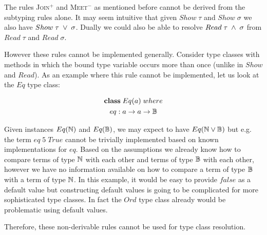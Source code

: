 The rules \textsc{Join}$^+$ and \textsc{Meet}$^-$ as mentioned before cannot be derived from the subtyping rules alone.
It may seem intuitive that given $Show \; \tau$ and $Show \; \sigma$ we also have $Show \; \tau \; \vee \; \sigma$.
Dually we could also be able to resolve $Read \; \tau \; \wedge \; \sigma$ from $Read \; \tau$ and $Read \; \sigma$.

However these rules cannot be implemented generally.
Consider type classes with methods in which the bound type variable occurs more than once (unlike in $Show$ and $Read$).
As an example where this rule cannot be implemented, let us look at the $Eq$ type class:

\begin{gather}
\nonumber {\bf class} \; Eq(a) \; where\\
\nonumber  eq : a \to a \to \mathbb{B}
\end{gather}

Given instances $Eq(\mathbb{N})$ and $Eq(\mathbb{B})$, we may expect to have $Eq(\mathbb{N} \vee \mathbb{B})$ but e.g. the term $eq \; 5 \; True$ cannot be trivially implemented based on known implementations for $eq$.
Based on the assumptions we already know how to compare terms of type $\mathbb{N}$ with each other and terms of type $\mathbb{B}$ with each other,
however we have no information available on how to compare a term of type $\mathbb{B}$ with a term of type $\mathbb{N}$.
In this example, it would be easy to provide $false$ as a default value but constructing default values is going to be complicated for more sophisticated type classes.
In fact the $Ord$ type class already would be problematic using default values.

Therefore, these non-derivable rules cannot be used for type class resolution.




